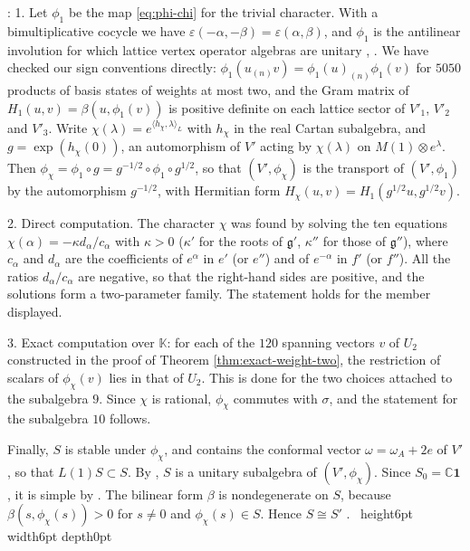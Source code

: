\documentclass[leqno]{article}
\newcommand{\Cbb}{\ensuremath{\mathbb{C}}}
\newcommand{\K}{\ensuremath{\mathbb{K}}}
\newcommand{\qed}{\hfill \vrule height6pt  width6pt depth0pt}
\newcommand{\ot}{\otimes}
\newcommand{\epsi}{\varepsilon}
\newenvironment{proof}[1][]{\noindent {\it Proof #1} : }{\hbox{~}\qed
\smallskip
}
\numberwithin{equation}{section}
\begin{document}
\begin{proof}
1. Let $\phi_1$ be the map \eqref{eq:phi-chi} for the trivial character. With a bimultiplicative cocycle we have $\epsi(-\alpha,-\beta) = \epsi(\alpha,\beta)$, and $\phi_1$ is the antilinear involution for which lattice vertex operator algebras are unitary \cite[Theorem 4.12]{DoL14}, \cite[Example 5.9]{CKLW18}. We have checked our sign conventions directly: $\phi_1(u_{(n)}v) = \phi_1(u)_{(n)}\phi_1(v)$ for $5050$ products of basis states of weights at most two, and the Gram matrix of $H_1(u,v) = \beta(u,\phi_1(v))$ is positive definite on each lattice sector of $V'_1$, $V'_2$ and $V'_3$. Write $\chi(\lambda) = e^{\langle h_\chi,\lambda\rangle_L}$ with $h_\chi$ in the real Cartan subalgebra, and $g = \exp(h_\chi(0))$, an automorphism of $V'$ acting by $\chi(\lambda)$ on $M(1) \ot e^\lambda$. Then $\phi_\chi = \phi_1 \circ g = g^{-1/2} \circ \phi_1 \circ g^{1/2}$, so that $(V',\phi_\chi)$ is the transport of $(V',\phi_1)$ by the automorphism $g^{-1/2}$, with Hermitian form $H_\chi(u,v) = H_1(g^{1/2}u,g^{1/2}v)$.

2. Direct computation. The character $\chi$ was found by solving the ten equations $\chi(\alpha) = -\kappa d_\alpha/c_\alpha$ with $\kappa > 0$ ($\kappa'$ for the roots of $\mathfrak g'$, $\kappa''$ for those of $\mathfrak g''$), where $c_\alpha$ and $d_\alpha$ are the coefficients of $e^{\alpha}$ in $e'$ (or $e''$) and of $e^{-\alpha}$ in $f'$ (or $f''$). All the ratios $d_\alpha/c_\alpha$ are negative, so that the right-hand sides are positive, and the solutions form a two-parameter family. The statement holds for the member displayed.

3. Exact computation over $\K$: for each of the $120$ spanning vectors $v$ of $U_2$ constructed in the proof of Theorem \ref{thm:exact-weight-two}, the restriction of scalars of $\phi_\chi(v)$ lies in that of $U_2$. This is done for the two choices attached to the subalgebra $9$. Since $\chi$ is rational, $\phi_\chi$ commutes with $\sigma$, and the statement for the subalgebra $10$ follows.

Finally, $S$ is stable under $\phi_\chi$, and contains the conformal vector $\omega = \omega_A + 2e$ of $V'$, so that $L(1)S \subset S$. By \cite[Proposition 5.23]{CKLW18}, $S$ is a unitary subalgebra of $(V',\phi_\chi)$. Since $S_0 = \Cbb\mathbf 1$, it is simple by \cite[Proposition 5.3]{CKLW18}. The bilinear form $\beta$ is nondegenerate on $S$, because $\beta(s,\phi_\chi(s)) > 0$ for $s \neq 0$ and $\phi_\chi(s) \in S$. Hence $S \cong S'$ \cite{FHL93}.
\end{proof}
\end{document}

